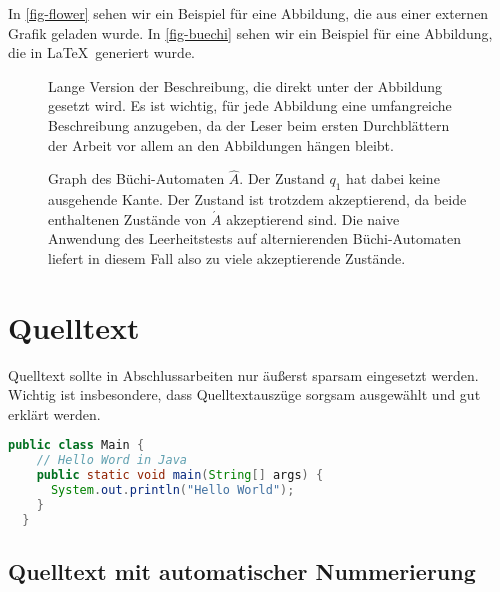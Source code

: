 In \vref{fig-flower} sehen wir ein Beispiel für eine Abbildung, die aus einer externen Grafik geladen wurde. In \vref{fig-buechi} sehen wir ein Beispiel für eine Abbildung, die in \LaTeX\ generiert wurde.

\begin{figure}
  \centering
  \caption[Kurzfassung der Beschreibung für das Abbildungsverzeichnis]{Lange Version der Beschreibung, die direkt unter der Abbildung gesetzt wird. Es ist wichtig, für jede Abbildung eine umfangreiche Beschreibung anzugeben, da der Leser beim ersten Durchblättern der Arbeit vor allem an den Abbildungen hängen bleibt.}
  \label{fig-flower}
\end{figure}

\begin{figure}
  \centering
  \caption[Graph des Büchi-Automaten $\hat A$.]{Graph des Büchi-Automaten $\hat A$. Der Zustand $q_1$ hat dabei keine ausgehende Kante. Der Zustand ist trotzdem akzeptierend, da beide enthaltenen Zustände von $\acute A$ akzeptierend sind. Die naive Anwendung des Leerheitstests auf alternierenden Büchi-Automaten liefert in diesem Fall also zu viele akzeptierende Zustände.}
  \label{fig-buechi}
\end{figure}

\section{Quelltext}

Quelltext sollte in Abschlussarbeiten nur äußerst sparsam eingesetzt werden. Wichtig ist insbesondere, dass Quelltextauszüge sorgsam ausgewählt und gut erklärt werden.

\begin{lstlisting}[language=Java,gobble=2]
  public class Main {
    // Hello Word in Java
    public static void main(String[] args) {
      System.out.println("Hello World");
    }
  }
\end{lstlisting}

\subsection{Quelltext mit automatischer Nummerierung}

